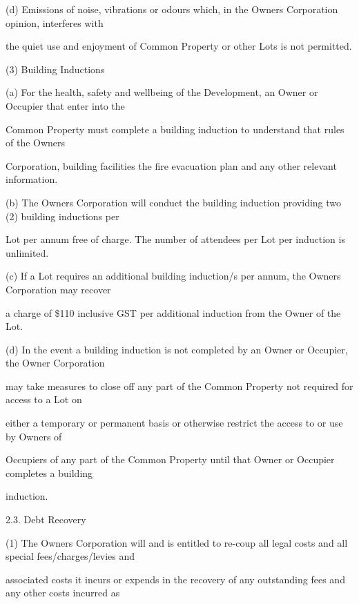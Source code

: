 \documentclass{article}
\begin{document}
{\fontsize{9.962}{1}(d) Emissions of noise, vibrations or odours which, in the Owners Corporation opinion, interferes with }

{\fontsize{10.02}{1}the quiet use and enjoyment of Common Property or other Lots is not permitted. }

\newpage

{\fontsize{9.962}{1}(3) Building Inductions }

{\fontsize{9.962}{1}(a) For the health, safety and wellbeing of the Development, an Owner or Occupier that enter into the }

{\fontsize{10.02}{1}Common Property must complete a building induction to understand that rules of the Owners }

{\fontsize{10.02}{1}Corporation, building facilities the fire evacuation plan and any other relevant information. }

{\fontsize{9.962}{1}(b) The Owners Corporation will conduct the building induction providing two (2) building inductions per }

{\fontsize{10.02}{1}Lot per annum free of charge. The number of attendees per Lot per induction is unlimited. }

{\fontsize{9.962}{1}(c) If a Lot requires an additional building induction/s per annum, the Owners Corporation may recover }

{\fontsize{10.02}{1}a charge of \$110 inclusive GST per additional induction from the Owner of the Lot. }

{\fontsize{9.962}{1}(d) In the event a building induction is not completed by an Owner or Occupier, the Owner Corporation }

{\fontsize{10.02}{1}may take measures to close off any part of the Common Property not required for access to a Lot on }

{\fontsize{10.02}{1}either a temporary or permanent basis or otherwise restrict the access to or use by Owners of }

{\fontsize{10.02}{1}Occupiers of any part of the Common Property until that Owner or Occupier completes a building }

{\fontsize{10.02}{1}induction. }

{\fontsize{9.99}{1}2.3. Debt Recovery }

{\fontsize{9.962}{1}(1) The Owners Corporation will and is entitled to re-coup all legal costs and all special fees/charges/levies and }

{\fontsize{10.02}{1}associated costs it incurs or expends in the recovery of any outstanding fees and any other costs incurred as }
\end{document}

